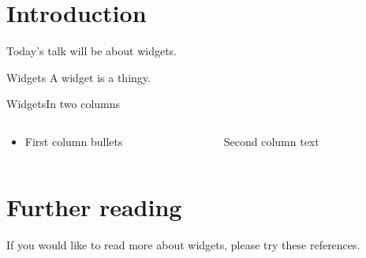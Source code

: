 
\date{9 September 2011}
\author{James Keirstead}



\begin{frame}
\maketitle
\end{frame}


\section{Introduction}
Today's talk will be about widgets.  

\begin{frame}{Widgets}
A widget is a thingy.
\end{frame}

\begin{frame}{Widgets}{In two columns}
\begin{columns}[t]
\begin{column}{0.5\textwidth}
\begin{itemize}
\item First column bullets
\end{itemize}
\end{column}
\pause %
\begin{column}{0.5\textwidth}
Second column text \citep{Body2000}
\end{column}
\end{columns}
\end{frame}

\section{Further reading}
If you would like to read more about widgets, please try these references.
\begin{frame}[allowframebreaks]%


\end{frame}


